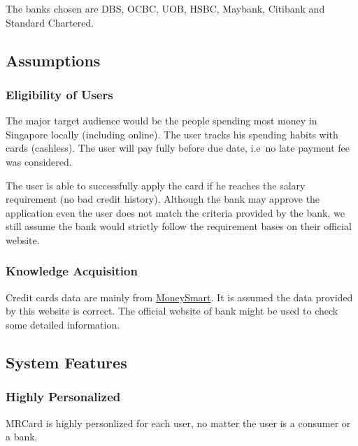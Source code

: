 The banks chosen are DBS, OCBC, UOB, HSBC, Maybank, Citibank and Standard Chartered.


\subsection{Assumptions} %
\label{sub:assumptions}

	\subsubsection{Eligibility of Users} %
	\label{ssub:eligibility_of_users}
	The major target audience would be the people spending most money in Singapore locally (including online). The user tracks his spending habits with cards (cashless). The user will pay fully before due date, i.e\ no late payment fee was considered.

	The user is able to successfully apply the card if he reaches the salary requirement (no bad credit history). Although the bank may approve the application even the user does not match the criteria provided by the bank, we still assume the bank would strictly follow the requirement bases on their official website.


	\subsubsection{Knowledge Acquisition} %
	\label{ssub:knowledge_acquisition}
	Credit cards data are mainly from \href{https://www.moneysmart.sg/credit-cards}{MoneySmart}. It is assumed the data provided by this website is correct. The official website of bank might be used to check some detailed information.




\subsection{System Features} %
\label{sub:system_features}

	\subsubsection{Highly Personalized} %
	\label{ssub:highly_personalized}
	MRCard is highly personlized for each user, no matter the user is a consumer or a bank.

